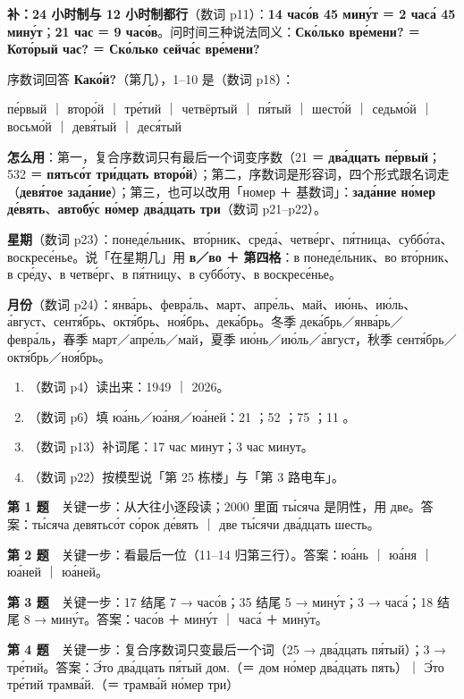 \textbf{补：24 小时制与 12 小时制都行}（数词 p11）：\textbf{14 часо́в 45 мину́т} ＝ \textbf{2 часа́ 45 мину́т}；\textbf{21 час} ＝ \textbf{9 часо́в}。问时间三种说法同义：\textbf{Ско́лько вре́мени?} ＝ \textbf{Кото́рый час?} ＝ \textbf{Ско́лько сейча́с вре́мени?}


序数词回答 \textbf{Како́й?}（第几），1--10 是（数词 p18）：

\begin{center}
пе́рвый ｜ второ́й ｜ тре́тий ｜ четвёртый ｜ пя́тый ｜ шесто́й ｜ седьмо́й ｜ восьмо́й ｜ девя́тый ｜ деся́тый
\end{center}

\textbf{怎么用}：第一，复合序数词只有最后一个词变序数（21 ＝ \textbf{два́дцать пе́рвый}；532 ＝ \textbf{пятьсо́т три́дцать второ́й}）；第二，序数词是形容词，四个形式跟名词走（\textbf{девя́тое зада́ние}）；第三，也可以改用「номер ＋ 基数词」：\textbf{зада́ние но́мер де́вять}、\textbf{автобу́с но́мер два́дцать три}（数词 p21--p22）。

\textbf{星期}（数词 p23）：понеде́льник、вто́рник、среда́、четве́рг、пя́тница、суббо́та、воскресе́нье。说「在星期几」用 \textbf{в／во ＋ 第四格}：в понеде́льник、во вто́рник、в сре́ду、в четве́рг、в пя́тницу、в суббо́ту、в воскресе́нье。

\textbf{月份}（数词 p24）：янва́рь、февра́ль、март、апре́ль、май、ию́нь、ию́ль、а́вгуст、сентя́брь、октя́брь、ноя́брь、дека́брь。冬季 дека́брь／янва́рь／февра́ль，春季 март／апре́ль／май，夏季 ию́нь／ию́ль／а́вгуст，秋季 сентя́брь／октя́брь／ноя́брь。


\begin{enumerate}[label=\textbf{第 \arabic* 题}]
\item （数词 p4）读出来：1949 ｜ 2026。
\item （数词 p6）填 юа́нь／юа́ня／юа́ней：21 \blank；52 \blank；75 \blank；11 \blank。
\item （数词 p13）补词尾：17 час минут\blank；3 час минут\blank。
\item （数词 p22）按模型说「第 25 栋楼」与「第 3 路电车」。
\end{enumerate}

\textbf{第 1 题}　关键一步：从大往小逐段读；2000 里面 ты́сяча 是阴性，用 две。答案：ты́сяча девятьсо́т со́рок де́вять ｜ две ты́сячи два́дцать шесть。

\textbf{第 2 题}　关键一步：看最后一位（11--14 归第三行）。答案：юа́нь ｜ юа́ня ｜ юа́ней ｜ юа́ней。

\textbf{第 3 题}　关键一步：17 结尾 7 → часо́в；35 结尾 5 → мину́т；3 → часа́；18 结尾 8 → мину́т。答案：часо́в ＋ мину́т ｜ часа́ ＋ мину́т。

\textbf{第 4 题}　关键一步：复合序数词只变最后一个词（25 → два́дцать пя́тый）；3 → тре́тий。答案：Э́то два́дцать пя́тый дом.（＝ дом но́мер два́дцать пять）｜ Э́то тре́тий трамва́й.（＝ трамва́й но́мер три）
